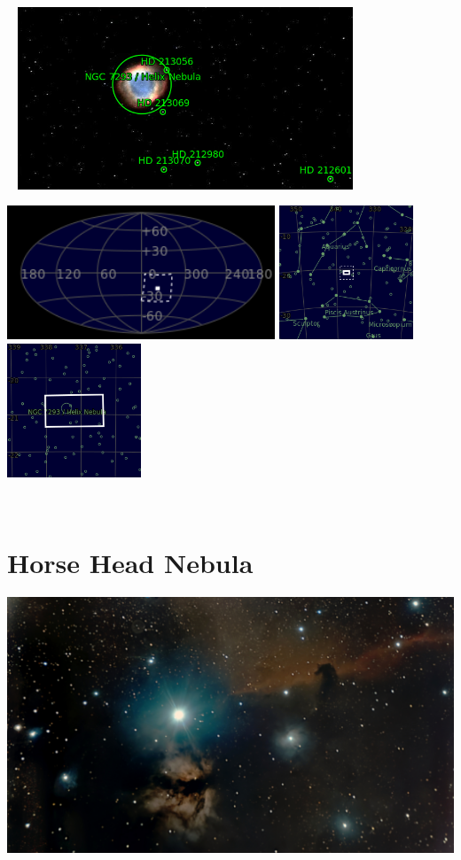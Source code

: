 \begin{center}
 \ \newpage
\includegraphics[width=0.75\textwidth]{../Imaging//Annotated/Helix_Nebula_Annotated.jpg}

\includegraphics[height=4cm]{../Imaging//Annotated/Helix_Nebula_Globe.jpg}
\includegraphics[height=4cm]{../Imaging//Annotated/Helix_Nebula_Close.jpg}
\includegraphics[height=4cm]{../Imaging//Annotated/Helix_Nebula_Closer.jpg}
\end{center}
\ \\\section{Horse Head Nebula}
\includegraphics[width=\textwidth]{../Imaging//Original/Horse_Head_Nebula.jpg}
